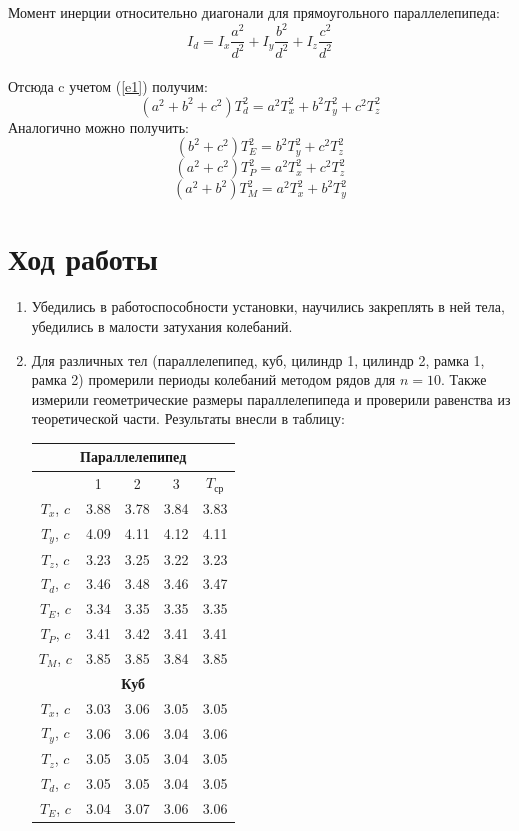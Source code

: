 \documentclass[a4paper, 12pt]{article}
\begin{document}
Момент инерции относительно диагонали для прямоугольного параллелепипеда: $$I_d=I_x\frac{a^2}{d^2}+I_y\frac{b^2}{d^2}+I_z\frac{c^2}{d^2}$$\\
Отсюда c учетом (\ref{e1}) получим: $$(a^2+b^2+c^2)T^2_d=a^2T^2_x+b^2T^2_y+c^2T^2_z$$
Аналогично можно получить:
$$(b^2+c^2)T^2_E=b^2T^2_y+c^2T^2_z$$
$$(a^2+c^2)T^2_P=a^2T^2_x+c^2T^2_z$$
$$(a^2+b^2)T^2_M=a^2T^2_x+b^2T^2_y$$
\vspace{10pt}
\section*{Ход работы}
\begin{enumerate}
    \item Убедились в работоспособности установки, научились закреплять в ней тела, убедились в малости затухания колебаний.
    \item Для различных тел (параллелепипед, куб, цилиндр 1, цилиндр 2, рамка 1, рамка 2) промерили периоды колебаний методом рядов для $n=10$. Также измерили геометрические размеры параллелепипеда и проверили равенства из теоретической части. Результаты внесли в таблицу:\newpage
    \begin{table}[h]
        \begin{tabular}{|c|cccc|}
        \hline \multicolumn{5}{|c|}{\textbf{Параллелепипед}}\\ \hline
        & 1& 2& 3& $T_{ср}$\\ \hline
        $T_x$, $c$& 3.88& 3.78& 3.84& 3.83\\
        $T_y$, $c$& 4.09& 4.11& 4.12& 4.11\\
        $T_z$, $c$& 3.23& 3.25& 3.22& 3.23\\
        $T_d$, $c$& 3.46& 3.48& 3.46& 3.47\\
        $T_E$, $c$& 3.34& 3.35& 3.35& 3.35\\
        $T_P$, $c$& 3.41& 3.42& 3.41& 3.41\\
        $T_M$, $c$& 3.85& 3.85& 3.84& 3.85\\
        \hline \multicolumn{5}{|c|}{\textbf{Куб}} \\ \hline
        $T_x$, $c$& 3.03& 3.06& 3.05& 3.05\\
        $T_y$, $c$& 3.06& 3.06& 3.04& 3.06\\
        $T_z$, $c$& 3.05& 3.05& 3.04& 3.05\\
        $T_d$, $c$& 3.05& 3.05& 3.04& 3.05\\
        $T_E$, $c$& 3.04& 3.07& 3.06& 3.06\\

\end{tabular}
\end{table}
\end{enumerate}
\end{document}
